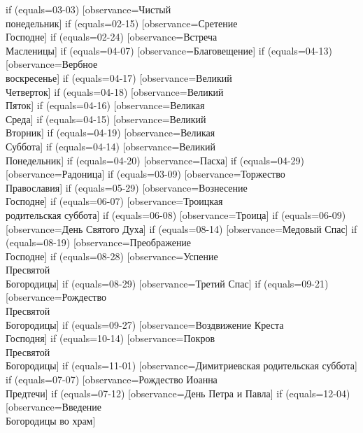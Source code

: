 {  if (equals=03-03) [observance=Чистый\\ понедельник]
  if (equals=02-15) [observance=Сретение\\ Господне]
  if (equals=02-24) [observance=Встреча\\ Масленицы]
  if (equals=04-07) [observance=Благовещение]
  if (equals=04-13) [observance=Вербное\\ воскресенье]
  if (equals=04-17) [observance=Великий\\ Четверток]
  if (equals=04-18) [observance=Великий\\ Пяток]
  if (equals=04-16) [observance=Великая\\ Среда]
  if (equals=04-15) [observance=Великий\\ Вторник]
  if (equals=04-19) [observance=Великая\\ Суббота]
  if (equals=04-14) [observance=Великий\\ Понедельник]
  if (equals=04-20) [observance=Пасха]
  if (equals=04-29) [observance=Радоница]
  if (equals=03-09) [observance=Торжество\\ Православия]
  if (equals=05-29) [observance=Вознесение\\ Господне]
  if (equals=06-07) [observance=Троицкая\\ родительская суббота]
  if (equals=06-08) [observance=Троица]
  if (equals=06-09) [observance=День Святого Духа]
  if (equals=08-14) [observance=Медовый Спас]
  if (equals=08-19) [observance=Преображение\\ Господне]
  if (equals=08-28) [observance=Успение\\ Пресвятой\\ Богородицы]
  if (equals=08-29) [observance=Третий Спас]
  if (equals=09-21) [observance=Рождество\\ Пресвятой\\ Богородицы]
  if (equals=09-27) [observance=Воздвижение Креста\\ Господня]
  if (equals=10-14) [observance=Покров\\ Пресвятой\\ Богородицы]
  if (equals=11-01) [observance=Димитриевская родительская суббота]
  if (equals=07-07) [observance=Рождество Иоанна\\ Предтечи]
  if (equals=07-12) [observance=День Петра и Павла]
  if (equals=12-04) [observance=Введение\\ Богородицы во храм]
}
